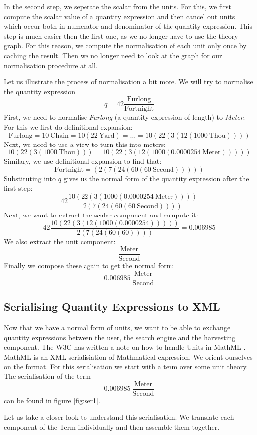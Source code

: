 In the second step, we seperate the scalar from the units. For this, we first compute the scalar value of a quantity expression and then cancel out units which occur both in numerator and denominator of the quantity expression. This step is much easier then the first one, as we no longer have to use the theory graph. For this reason, we compute the normalisation of each unit only once by caching the result. Then we no longer need to look at the graph for our normalisation procedure at all.

Let us illustrate the process of normalisation a bit more. We will try to normalise the quantity expression
\[q = 42 \frac{\text{Furlong}}{\text{Fortnight}}\]
First, we need to normalise \textit{Furlong} (a quantity expression of length) to \textit{Meter}. For this we first do definitional expansion:
\[\text{Furlong} = 10\ \text{Chain} = 10 \left( 22\ \text{Yard}\right) = \dots = 10 \left( 22 \left( 3 \left( 12 \left( 1000\ \text{Thou} \right) \right) \right)\right) \]
Next, we need to use a view to turn this into meters:
\[10 \left( 22 \left( 3 \left( 1000\ \text{Thou} \right) \right)\right) = 10 \left( 22 \left( 3 \left( 12 \left( 1000 \left( 0.0000254\ \text{Meter} \right) \right) \right) \right)\right)\]
Similary, we use definitional expansion to find that:
\[\text{Fortnight} = \left( 2 \left( 7 \left( 24 \left( 60 \left( 60\ \text{Second} \right) \right) \right) \right) \right) \]
Substituting into $q$ gives us the normal form of the quantity expression after the first step:
\[42 \frac{10 \left( 22 \left( 3 \left( 1000 \left( 0.0000254\ \text{Meter} \right) \right) \right)\right)}{ 2 \left( 7 \left( 24 \left( 60 \left( 60\ \text{Second} \right) \right) \right) \right)}\]
Next, we want to extract the scalar component and compute it:
\[42 \frac{10 \left( 22 \left( 3 \left( 12 \left( 1000 \left( 0.0000254 \right) \right) \right) \right)\right)}{ 2 \left( 7 \left( 24 \left( 60 \left( 60\right) \right) \right) \right)} = 0.006985 \]
We also extract the unit component:
\[\frac{\text{Meter}}{\text{Second}}\]
Finally we compose these again to get the normal form:
\[0.006985\ \frac{\text{Meter}}{\text{Second}}\]

\subsection{Serialising Quantity Expressions to XML}

Now that we have a normal form of units, we want to be able to exchange quantity expressions between the user, the search engine and the harvesting component. The W3C has written a note on how to handle Units in MathML \cite{W3C:Unitnnote}. MathML is an XML serialisiation of Mathmatical expression. We orient ourselves on the format. For this serialisation we start with a term over some unit theory. The serialisation of the term
\[0.006985\ \frac{\text{Meter}}{\text{Second}}\]
can be found in figure \ref{fig:ser1}.

Let us take a closer look to understand this serialisation. We translate each component of the Term individually and then assemble them together.

